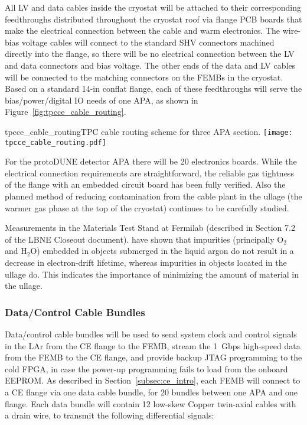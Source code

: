 All LV and data cables inside the cryostat will be attached to their corresponding feedthroughs 
distributed throughout the cryostat roof via flange PCB boards that make the electrical connection
between the cable and warm electronics. The wire-bias voltage cables will connect to the standard SHV
connectors machined directly into the flange, so there will be no electrical connection between 
the LV and data connectors and bias voltage.
The other ends of the data and LV cables will be connected to the matching connectors on the FEMBs in the cryostat.
Based on a standard 14-in conflat flange,
each of these feedthroughs will serve the bias/power/digital IO needs of one APA, as shown 
in Figure~\ref{fig:tpcce_cable_routing}.  

\begin{cdrfigure}{tpcce_cable_routing}{TPC cable routing scheme for three APA section.}
\texttt{[image: tpcce\_cable\_routing.pdf]}
\end{cdrfigure}


For the protoDUNE detector APA there will be 20 electronics boards.
While the electrical connection requirements are straightforward,
the reliable gas tightness of the flange with an embedded circuit board has been fully verified.
Also the planned method of reducing contamination from the cable plant in the ullage
(the warmer gas phase at the top of the cryostat) 
continues to be carefully studied.

Measurements in the Materials Test Stand at Fermilab (described in Section 7.2 of the LBNE Closeout document).
have shown that impurities (principally O$_2$ and H$_2$O) embedded in objects submerged in the liquid argon do not result
in a decrease in electron-drift lifetime, whereas impurities in objects located in the ullage do.
This indicates the importance of minimizing the amount of material in the ullage.

%
\subsubsection{Data/Control Cable Bundles}
\label{subsubsec:ce_data_cable}

Data/control cable bundles will be used to send system clock and control signals in the LAr from the 
CE flange to the FEMB, stream the 1~Gbps high-speed data from the FEMB to the CE flange, and 
provide backup JTAG programming to the cold FPGA, in case the power-up programming fails to 
load from the onboard EEPROM. As described in Section~\ref{subsec:ce_intro}, each FEMB will 
connect to a CE flange via one data cable bundle, for 20 bundles between one APA and one flange.
Each data bundle will contain 12 low-skew Copper twin-axial cables with a drain wire, 
to transmit the following differential signals:

